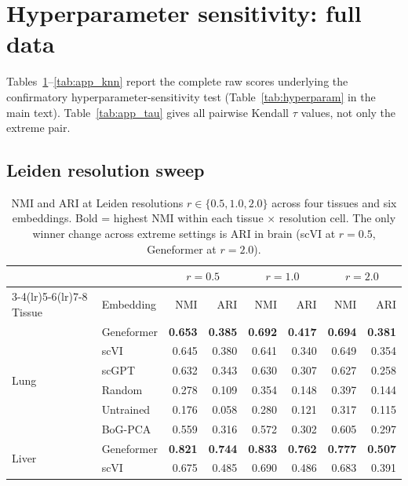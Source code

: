 \documentclass[11pt]{article}
\begin{document}
\section{Hyperparameter sensitivity: full data}
\label{app:hyperparam}

Tables~\ref{tab:app_leiden}--\ref{tab:app_knn} report the complete raw scores underlying the confirmatory hyperparameter-sensitivity test (Table~\ref{tab:hyperparam} in the main text). Table~\ref{tab:app_tau} gives all pairwise Kendall $\tau$ values, not only the extreme pair.

\subsection{Leiden resolution sweep}

\begin{table}[h!]
\centering
\caption{NMI and ARI at Leiden resolutions $r \in \{0.5, 1.0, 2.0\}$ across four tissues and six embeddings. Bold = highest NMI within each tissue $\times$ resolution cell. The only winner change across extreme settings is ARI in brain (scVI at $r=0.5$, Geneformer at $r=2.0$).}
\label{tab:app_leiden}
\scriptsize
\begin{tabular}{@{}ll rr rr rr@{}}
\toprule
 & & \multicolumn{2}{c}{$r = 0.5$} & \multicolumn{2}{c}{$r = 1.0$} & \multicolumn{2}{c}{$r = 2.0$} \\
\cmidrule(lr){3-4}\cmidrule(lr){5-6}\cmidrule(lr){7-8}
Tissue & Embedding & NMI & ARI & NMI & ARI & NMI & ARI \\
\midrule
\multirow{6}{*}{Lung}
 & Geneformer & \textbf{0.653} & \textbf{0.385} & \textbf{0.692} & \textbf{0.417} & \textbf{0.694} & \textbf{0.381} \\
 & scVI       & 0.645 & 0.380 & 0.641 & 0.340 & 0.649 & 0.354 \\
 & scGPT      & 0.632 & 0.343 & 0.630 & 0.307 & 0.627 & 0.258 \\
 & Random     & 0.278 & 0.109 & 0.354 & 0.148 & 0.397 & 0.144 \\
 & Untrained  & 0.176 & 0.058 & 0.280 & 0.121 & 0.317 & 0.115 \\
 & BoG-PCA    & 0.559 & 0.316 & 0.572 & 0.302 & 0.605 & 0.297 \\
\midrule
\multirow{6}{*}{Liver}
 & Geneformer & \textbf{0.821} & \textbf{0.744} & \textbf{0.833} & \textbf{0.762} & \textbf{0.777} & \textbf{0.507} \\
 & scVI       & 0.675 & 0.485 & 0.690 & 0.486 & 0.683 & 0.391 \\

\end{tabular}
\end{table}
\end{document}
